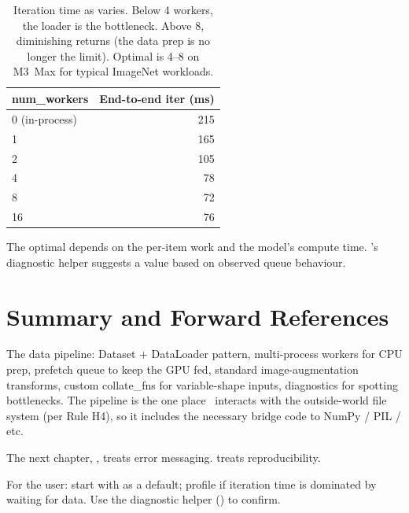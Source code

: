 \begin{table}[t]
\centering
\small
\begin{tabular}{lr}
\toprule
num\_workers & End-to-end iter (ms) \\
\midrule
0  (in-process) & 215 \\
1  & 165 \\
2  & 105 \\
4  & 78  \\
8  & 72  \\
16 & 76  \\
\bottomrule
\end{tabular}
\caption[Worker count sweep.]{Iteration time as
 varies. Below 4 workers, the loader is the
bottleneck. Above 8, diminishing returns (the data prep is no
longer the limit). Optimal is 4--8 on M3~Max for typical
ImageNet workloads.}
\label{tab:data_pipeline:worker_sweep}
\end{table}

The optimal  depends on the per-item work
and the model's compute time. \Lucid's diagnostic helper
suggests a value based on observed queue behaviour.

\section{Summary and Forward References}
\label{sec:data_pipeline:summary}

The data pipeline: Dataset + DataLoader pattern, multi-process
workers for CPU prep, prefetch queue to keep the GPU fed,
standard image-augmentation transforms, custom collate\_fns
for variable-shape inputs, diagnostics for spotting
bottlenecks. The pipeline is the one place \Lucid\ interacts
with the outside-world file system (per Rule H4), so it
includes the necessary bridge code to NumPy / PIL / etc.

The next chapter, , treats error
messaging.  treats reproducibility.

\begin{lucidnote}
For the user: start with  as a default;
profile if iteration time is dominated by waiting for data.
Use the diagnostic helper ()
to confirm.
\end{lucidnote}

